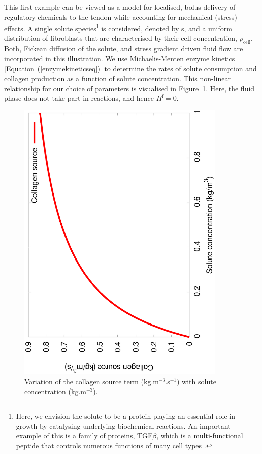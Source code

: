 This first example can be viewed as a model for localised, bolus
delivery of regulatory chemicals to the tendon while accounting for
mechanical (stress) effects. A single solute species\footnote{Here, we
  envision the solute to be a protein playing 
  an essential role in growth by catalysing underlying biochemical
  reactions. An important example of this is a family of proteins,
  TGF$\beta$, which is a multi-functional peptide that controls numerous
  functions of many cell types \citep{Alberts:02}.} is considered,
denoted by s, and 
a uniform distribution of fibroblasts that are characterised by their
cell concentration, $\rho_{\mathrm{cell}}$. Both, Fickean diffusion of
the solute, and stress gradient driven fluid flow are incorporated in this
illustration. We use 
Michaelis-Menten enzyme kinetics [Equation~(\ref{enzymekineticseq})]
to determine the rates of solute consumption and collagen production
as a function of solute concentration. This non-linear relationship for
our choice of parameters is visualised in
Figure~\ref{eg3menten}. Here, the fluid phase does not  take part in
reactions, and hence $\Pi^\mathrm{f}=0$. 

\begin{figure}
\centering
\includegraphics[angle=270,width=10.00cm]{images/enzyme-kinetics.eps}
\caption{Variation of the collagen source term (kg.m$^{-3}$.s$^{-1}$)
  with solute concentration (kg.m$^{-3}$).}
\label{eg3menten}
\end{figure}

